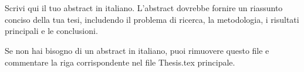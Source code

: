 
\begin{center}

\end{center}

\begin{center}
{{\bf\fontsize{14pt}{14.5pt}\selectfont {Abstract (Italian)}}}
\end{center}

\doublespacing
{}



\begin{center}
	\begin{doublespace}
{\fontsize{14pt}{14.5pt}\selectfont {\thesisTitleIT}}\\
		{\fontsize{14pt}{14.5pt}\selectfont {\thesisAuthor}}\\
	\end{doublespace}
\end{center}

\setlength{\parindent}{0cm}
Scrivi qui il tuo abstract in italiano. L'abstract dovrebbe fornire un riassunto conciso della tua tesi, includendo il problema di ricerca, la metodologia, i risultati principali e le conclusioni.

Se non hai bisogno di un abstract in italiano, puoi rimuovere questo file e commentare la riga corrispondente nel file Thesis.tex principale.
